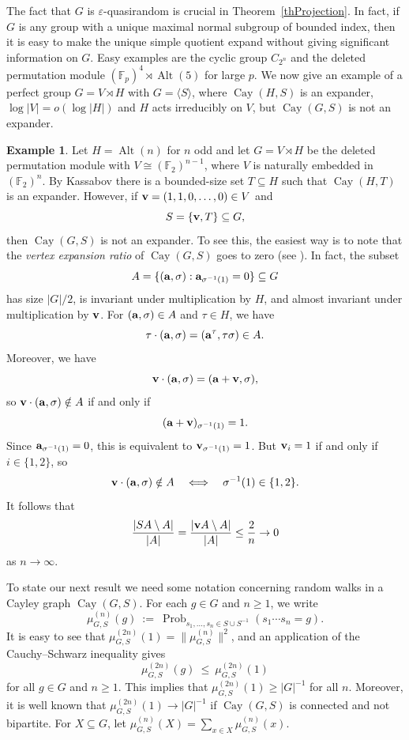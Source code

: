 \documentclass[11pt,reqno]{amsart}
\numberwithin{equation}{section}
\theoremstyle{definition}
\newtheorem{example}[theorem]{Example}
\theoremstyle{remark}
\newcommand{\Alt}{\mathop{\mathrm{Alt}}}
\newcommand{\Cay}{\mathop{\mathrm{Cay}}}
\newcommand{\Prob}{\mathop{\mathrm{Prob}}}
\begin{document}
The fact that $G$ is $\varepsilon$-quasirandom is crucial in Theorem~\ref{thProjection}.
In fact, if $G$ is any group with a unique maximal normal subgroup of bounded index,
then it is easy to make the unique simple quotient expand without giving significant information on $G$.
Easy examples are the cyclic group $C_{2^n}$ and the deleted permutation module
$(\mathbb{F}_p)^4 \rtimes \Alt(5)$ for large $p$.
We now give an example of a perfect group $G=V \rtimes H$ with $G = \langle S \rangle$,
where $\Cay(H,S)$ is an expander, $\log|V|=o(\log|H|)$ and $H$ acts irreducibly on $V$,
but $\Cay(G,S)$ is not an expander.

\begin{example} \label{exBad}
Let $H=\Alt(n)$ for $n$ odd and let $G = V \rtimes H$ be the deleted permutation module
with $V \cong (\mathbb{F}_2)^{n-1}$, where $V$ is naturally embedded in $(\mathbb{F}_2)^n$.
By Kassabov \cite{Kas07} there is a bounded-size set $T \subseteq H$ such that $\Cay(H,T)$ is an expander.
However, if ${\bf v} = (1,1,0,\ldots,0) \in V$ and
$$ S = \{ {\bf v}, T \} \subseteq G , $$
then $\Cay(G,S)$ is not an expander.
To see this, the easiest way is to note that the \emph{vertex expansion ratio} of $\Cay(G,S)$ goes to zero
(see \cite[Definition~1.1]{Lub12}).
In fact, the subset
 $$ A = \{ \left( {\bf a} , \sigma \right) : {\bf a}_{\sigma^{-1}(1)}=0 \} \subseteq G $$
 has size $|G|/2$, is invariant under multiplication by $H$,
 and almost invariant under multiplication by ${\bf v}$.
For $({\bf a},\sigma) \in A$ and $\tau \in H$, we have
$$ \tau \cdot ({\bf a},\sigma) = (  {\bf a}^\tau , \tau \sigma ) \in A . $$
Moreover, we have
$$ {\bf v} \cdot ({\bf a},\sigma)=({\bf a}+{\bf v},\sigma), $$
so ${\bf v} \cdot ({\bf a},\sigma) \notin A$ if and only if
$$ ({\bf a}+{\bf v})_{\sigma^{-1}(1)}=1. $$
Since ${\bf a}_{\sigma^{-1}(1)}=0$, this is equivalent to ${\bf v}_{\sigma^{-1}(1)}=1$.
But ${\bf v}_i=1$ if and only if $i\in\{1,2\}$, so
$$
{\bf v}\cdot ({\bf a},\sigma)\notin A
\quad \Longleftrightarrow \quad
\sigma^{-1}(1)\in \{1,2\}.
$$
It follows that
$$
\frac{|S A \setminus A|}{|A|} =
\frac{|{\bf v} A \setminus A|}{|A|}
\leq \frac{2}{n} \to 0
$$
as $n \to \infty$.
\end{example}

To state our next result we need some notation concerning random walks in a Cayley graph $\Cay(G,S)$.
For each $g \in G$ and $n \geq 1$, we write
$$ \mu_{G,S}^{(n)}(g) \> := \> \Prob_{s_1,\ldots,s_n \in S \cup S^{-1}}( s_1 \cdots s_n = g ) . $$
It is easy to see that $\mu_{G,S}^{(2n)}(1) = \| \mu_{G,S}^{(n)} \|^2$,
and an application of the Cauchy--Schwarz inequality gives
\begin{equation} \label{eqRW}
\mu_{G,S}^{(2n)}(g) \> \leq \> \mu_{G,S}^{(2n)}(1) 
\end{equation}
for all $g \in G$ and $n \geq 1$.
This implies that $\mu_{G,S}^{(2n)}(1) \geq |G|^{-1}$ for all $n$.
Moreover,
it is well known that $\mu_{G,S}^{(2n)}(1) \to |G|^{-1}$ if $\Cay(G,S)$ is connected and not bipartite.
For $X \subseteq G$, let $\mu_{G,S}^{(n)}(X) = \sum_{x \in X} \mu_{G,S}^{(n)}(x)$.
\end{document}
